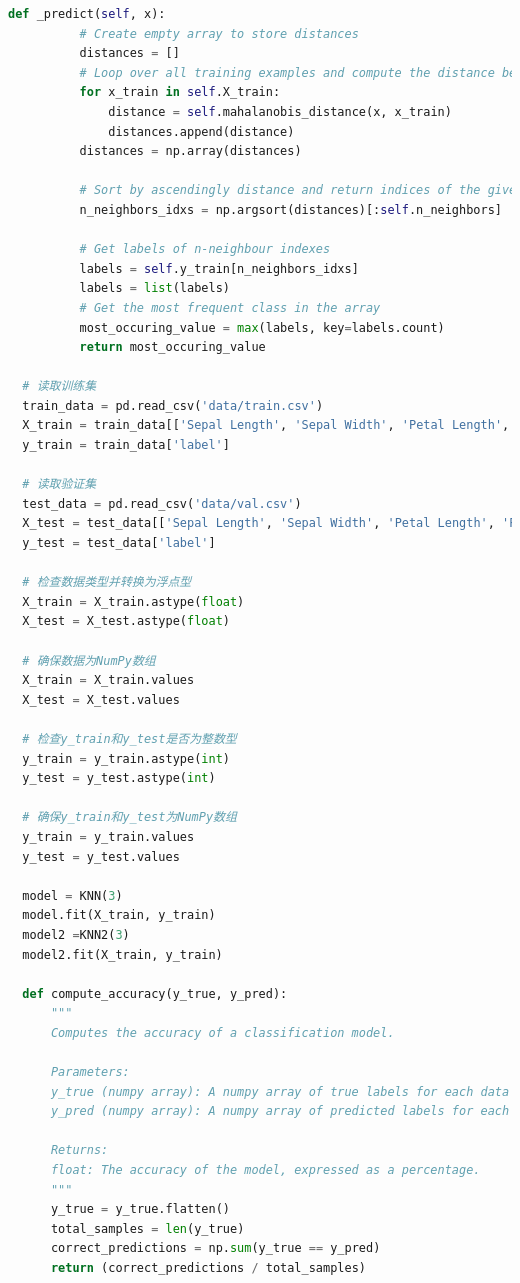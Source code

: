 \documentclass[12pt]{article}
\begin{document}
\begin{lstlisting}[language=Python]
      def _predict(self, x):
          # Create empty array to store distances
          distances = []
          # Loop over all training examples and compute the distance between x and all the training examples 
          for x_train in self.X_train:
              distance = self.mahalanobis_distance(x, x_train)
              distances.append(distance)
          distances = np.array(distances)
          
          # Sort by ascendingly distance and return indices of the given n neighbours
          n_neighbors_idxs = np.argsort(distances)[:self.n_neighbors]
          
          # Get labels of n-neighbour indexes
          labels = self.y_train[n_neighbors_idxs]
          labels = list(labels)
          # Get the most frequent class in the array
          most_occuring_value = max(labels, key=labels.count)
          return most_occuring_value
  
  # 读取训练集
  train_data = pd.read_csv('data/train.csv')
  X_train = train_data[['Sepal Length', 'Sepal Width', 'Petal Length', 'Petal Width']]
  y_train = train_data['label']
  
  # 读取验证集
  test_data = pd.read_csv('data/val.csv')
  X_test = test_data[['Sepal Length', 'Sepal Width', 'Petal Length', 'Petal Width']]
  y_test = test_data['label']
  
  # 检查数据类型并转换为浮点型
  X_train = X_train.astype(float)
  X_test = X_test.astype(float)
  
  # 确保数据为NumPy数组
  X_train = X_train.values
  X_test = X_test.values
  
  # 检查y_train和y_test是否为整数型
  y_train = y_train.astype(int)
  y_test = y_test.astype(int)
  
  # 确保y_train和y_test为NumPy数组
  y_train = y_train.values
  y_test = y_test.values
  
  model = KNN(3)
  model.fit(X_train, y_train)
  model2 =KNN2(3)
  model2.fit(X_train, y_train)
  
  def compute_accuracy(y_true, y_pred):
      """
      Computes the accuracy of a classification model.
  
      Parameters:
      y_true (numpy array): A numpy array of true labels for each data point.
      y_pred (numpy array): A numpy array of predicted labels for each data point.
  
      Returns:
      float: The accuracy of the model, expressed as a percentage.
      """
      y_true = y_true.flatten()
      total_samples = len(y_true)
      correct_predictions = np.sum(y_true == y_pred)
      return (correct_predictions / total_samples) 
  

\end{lstlisting}
\end{document}
